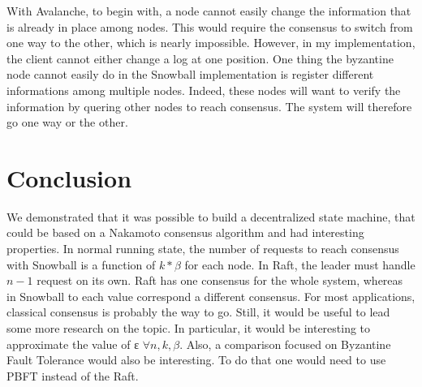 \documentclass[11pt, twocolumn]{article}
\begin{document}
With Avalanche, to begin with, a node cannot easily change the information that is already in place among nodes. This would require the consensus to switch from one way to the other, which is nearly impossible. However, in my implementation, the client cannot either change a log at one position.
One thing the byzantine node cannot easily do in the Snowball implementation is register different informations among multiple nodes. Indeed, these nodes will want to verify the information by quering other nodes to reach consensus. The system will therefore go one way or the other.

\section{Conclusion}

We demonstrated that it was possible to build a decentralized state machine, that could be based on a Nakamoto consensus algorithm and had interesting properties. 
In normal running state, the number of requests to reach consensus with Snowball is a function of $k * \beta$ for each node. In Raft, the leader must handle $n-1$ request on its own. 
Raft has one consensus for the whole system, whereas in Snowball to each value correspond a different consensus. For most applications, classical consensus is probably the way to go. Still, it would be useful to lead some more research on the topic. 
In particular, it would be interesting to approximate the value of ε $\forall n, k, \beta$. 
Also, a comparison focused on Byzantine Fault Tolerance would also be interesting. To do that one would need to use PBFT \cite{pbft} instead of the Raft.

\onecolumn
\end{document}
